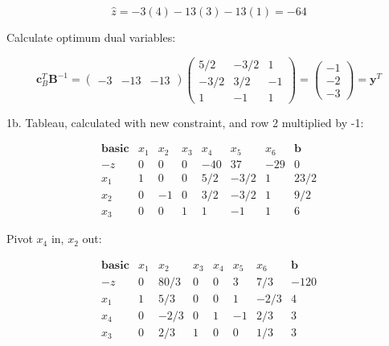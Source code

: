 \documentclass{article}
\begin{document}
\begin{displaymath}
\hat{z} = -3(4) - 13(3) - 13(1) = -64
\end{displaymath}

Calculate optimum dual variables:

\begin{displaymath}
\textbf{c}_B^T \textbf{B}^{-1} =
\left( \begin{array}{ccc} -3 & -13 & -13 \end{array} \right)
\left( \begin{array}{rrr}
5/2 & -3/2 & 1 \\
-3/2 & 3/2 & -1 \\
1 & -1 & 1
\end{array} \right) =
\left( \begin{array}{c} -1 \\ -2 \\ -3 \end{array} \right) =
\textbf{y}^T
\end{displaymath}

1b. Tableau, calculated with new constraint, and row 2 multiplied by -1:

\begin{displaymath}
\begin{array}{c|rrrrrr|r}
\textbf{basic} & x_1 & x_2 & x_3 & x_4 & x_5 & x_6 & \textbf{b} \\ 
\hline
-z & 0 & 0 & 0 & -40 & 37 & -29 & 0 \\
\hline
x_1 & 1 & 0 & 0 & 5/2 & -3/2 & 1 & 23/2 \\
x_2 & 0 & -1 & 0 & 3/2 & -3/2 & 1 & 9/2 \\
x_3 & 0 & 0 & 1 & 1 & -1 & 1 & 6
\end{array}
\end{displaymath}

Pivot $x_4$ in, $x_2$ out:

\begin{displaymath}
\begin{array}{c|rrrrrr|r}
\textbf{basic} & x_1 & x_2 & x_3 & x_4 & x_5 & x_6 & \textbf{b} \\ 
\hline
-z & 0 & 80/3 & 0 & 0 & 3 & 7/3 & -120 \\
\hline
x_1 & 1 & 5/3 & 0 & 0 & 1 & -2/3 & 4 \\
x_4 & 0 & -2/3 & 0 & 1 & -1 & 2/3 & 3 \\
x_3 & 0 & 2/3 & 1 & 0 & 0 & 1/3 & 3
\end{array}
\end{displaymath}
\end{document}
